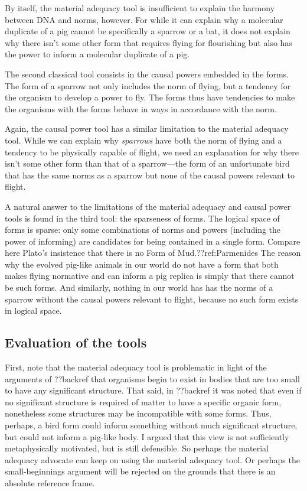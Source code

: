 By itself, the material adequacy tool is insufficient to explain the harmony between DNA and norms, however. For while 
it can explain why a molecular duplicate of a pig cannot be specifically a sparrow or a bat, it does not explain why there 
isn't some other form that requires flying for flourishing but also has the power to inform a molecular duplicate of a pig.

The second classical tool consists in the causal powers embedded in the forms. The form of a sparrow not only includes the 
norm of flying, but a tendency for the organism to develop a power to fly. The forms thus have tendencies to make the organisms
with the forms behave in ways in accordance with the norm.

Again, the causal power tool has a similar limitation to the material adequacy tool. While we can explain why \textit{sparrows}
have both the norm of flying and a tendency to be physically capable of flight, we need an explanation for why there isn't some 
other form than that of a sparrow---the form of an unfortunate bird that has the same norms as a sparrow but none of the causal 
powers relevant to flight. 

A natural answer to the limitations of the material adequacy and causal power tools is found in the third tool: the sparseness 
of forms. The logical space of forms is sparse: only some combinations of norms and powers (including 
the power of informing) are candidates for being contained in a single form. Compare here Plato's insistence that there is 
no Form of Mud.??ref:Parmenides The reason why the evolved pig-like animals in our world do not have a form that both makes 
flying normative and can inform a pig replica is simply that there cannot be such forms. And similarly, nothing in our world 
has has the norms of a sparrow without the causal powers relevant to flight, because no such form exists in logical space.

\subsection{Evaluation of the tools}
First, note that the material adequacy tool is problematic in light of the arguments of ??backref that organisms begin 
to exist in bodies that are too small to have any significant structure. That said, in ??backref it was noted that even 
if no significant structure is required of matter to have a specific organic form, nonetheless some structures may be 
incompatible with some forms. Thus, perhaps, a bird form could inform something without much significant structure, but 
could not inform a pig-like body. I argued that this view is not sufficiently metaphysically motivated, but is still
defensible. So perhaps the material adequacy advocate can keep on using the material adequacy tool. Or perhaps the
small-beginnings argument will be rejected on the grounds that there is an absolute reference frame.

